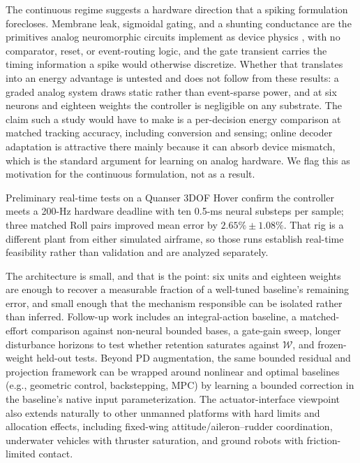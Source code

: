 \documentclass[letterpaper,10pt,conference]{IEEEtran}
\begin{document}
The continuous regime suggests a hardware direction that a spiking
formulation forecloses. Membrane leak, sigmoidal gating, and a shunting
conductance are the primitives analog neuromorphic circuits implement as
device physics \cite{mahowald1991vlsi}, with no comparator, reset, or
event-routing logic, and the gate transient carries the timing information a
spike would otherwise discretize. Whether that translates into an energy
advantage is untested and does not follow from these results: a graded
analog system draws static rather than event-sparse power, and at six
neurons and eighteen weights the controller is negligible on any substrate.
The claim such a study would have to make is a per-decision energy
comparison at matched tracking accuracy, including conversion and sensing;
online decoder adaptation is attractive there mainly because it can absorb
device mismatch, which is the standard argument for learning on analog
hardware. We flag this as motivation for the continuous formulation, not as
a result.

Preliminary real-time tests on a Quanser 3DOF Hover confirm the controller
meets a 200-Hz hardware deadline with ten 0.5-ms neural substeps per sample;
three matched Roll pairs improved mean error by $2.65\%\pm1.08\%$. That rig
is a different plant from either simulated airframe, so those runs establish
real-time feasibility rather than validation and are analyzed separately.

The architecture is small, and that is the point: six units and eighteen
weights are enough to recover a measurable fraction of a well-tuned
baseline's remaining error, and small enough that the mechanism responsible
can be isolated rather than inferred. Follow-up work includes an integral-action baseline, a matched-effort
comparison against non-neural bounded bases, a gate-gain sweep, longer
disturbance horizons to test whether retention saturates against
$\mathcal W$, and frozen-weight held-out tests. Beyond PD augmentation, the
same bounded residual and projection framework can be wrapped around
nonlinear and optimal baselines (e.g., geometric control, backstepping, MPC)
by learning a bounded correction in the baseline's native input
parameterization. The actuator-interface viewpoint also extends naturally to
other unmanned platforms with hard limits and allocation effects, including
fixed-wing attitude/aileron--rudder coordination, underwater vehicles with
thruster saturation, and ground robots with friction-limited contact.





\end{document}
